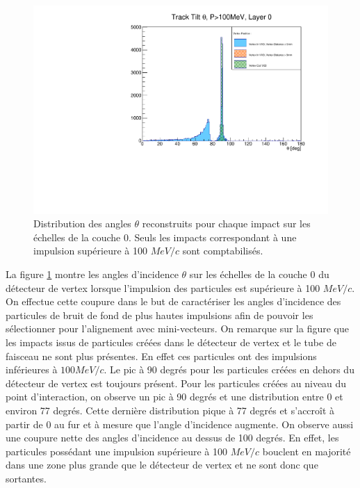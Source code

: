   \begin{figure}[!htb]
    \centering
    \includegraphics[scale=0.60]{./figures/Track_Tilts_Beamstrahlung/beamstrahlung_Theta/Track_Tilts_Theta_P_sup_100MeV_Layer0.pdf}
    \caption{Distribution des angles $\theta$ reconstruits pour chaque impact sur les \'echelles de la couche 0. Seuls les impacts correspondant \`a une impulsion sup\'erieure \`a 100 $MeV/c$ sont comptabilis\'es.}
    \label{fig:theta_Layer0_pT_sup_100MeV}
  \end{figure}
  
  La figure \ref{fig:theta_Layer0_pT_sup_100MeV} montre les angles d'incidence $\theta$ sur les \'echelles de la couche 0 du d\'etecteur de vertex lorsque l'impulsion des particules est sup\'erieure \`a 100 $MeV/c$. On effectue cette coupure dans le but de caract\'eriser les angles d'incidence des particules de bruit de fond de plus hautes impulsions afin de pouvoir les s\'electionner pour l'alignement avec mini-vecteurs. On remarque sur la figure que les impacts issus de particules cr\'e\'ees dans le détecteur de vertex  et le tube de faisceau ne sont plus pr\'esentes. En effet ces particules ont des impulsions inf\'erieures \`a $100 MeV/c$. Le pic \`a 90 degr\'es pour les particules cr\'eées en dehors du d\'etecteur de vertex est toujours pr\'esent. Pour les particules  cr\'e\'ees au niveau du point d'interaction, on observe un pic \`a 90 degr\'es et une distribution entre 0 et environ 77 degr\'es. Cette derni\`ere distribution pique \`a 77 degr\'es et s'accro\^it \`a partir de 0 au fur et \`a mesure que l'angle d'incidence augmente. On observe aussi une coupure nette des angles d'incidence au dessus de 100 degr\'es. En effet, les particules poss\'edant une impulsion sup\'erieure \`a 100 $MeV/c$ bouclent en majorit\'e dans une zone plus grande que le d\'etecteur de vertex et ne sont donc que sortantes.
  
